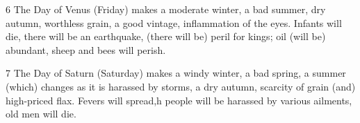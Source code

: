 \par 6 The Day of Venus (Friday) makes a moderate winter, a bad summer, dry autumn, worthless grain, a good vintage, inflammation of the eyes. Infants will die, there will be an earthquake, (there will be) peril for kings; oil (will be) abundant, sheep and bees will perish.

\par 7 The Day of Saturn (Saturday) makes a windy winter, a bad spring, a summer (which) changes as it is harassed by storms, a dry autumn, scarcity of grain (and) high-priced flax. Fevers will spread,h people will be harassed by various ailments, old men will die.


